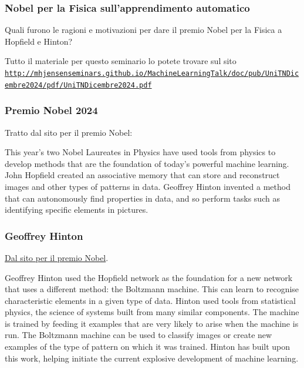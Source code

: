 \documentclass{beamer}
\begin{document}
\vspace{6mm}

\begin{frame}
\titlepage
\end{frame}

\begin{frame}
\frametitle{Nobel per la  Fisica  sull'apprendimento automatico}

\begin{block}{}
Quali furono le ragioni e motivazioni per dare  il premio Nobel per la Fisica a Hopfield e Hinton? 
\end{block}

\begin{block}{}
Tutto il materiale per questo seminario lo potete trovare sul sito  \href{{http://mhjensenseminars.github.io/MachineLearningTalk/doc/pub/UniTNDicembre2024/pdf/UniTNDicembre2024.pdf}}{\nolinkurl{http://mhjensenseminars.github.io/MachineLearningTalk/doc/pub/UniTNDicembre2024/pdf/UniTNDicembre2024.pdf}}
\end{block}
\end{frame}

\begin{frame}
\frametitle{Premio Nobel 2024}

Tratto dal sito per il premio Nobel:
\begin{block}{}
This year’s two Nobel Laureates in Physics have used tools from
physics to develop methods that are the foundation of today’s powerful
machine learning. John Hopfield created an associative memory that can
store and reconstruct images and other types of patterns in
data. Geoffrey Hinton invented a method that can autonomously find
properties in data, and so perform tasks such as identifying specific
elements in pictures.
\end{block}
\end{frame}

\begin{frame}
\frametitle{Geoffrey Hinton}

\href{{https://www.nobelprize.org/prizes/physics/2024/press-release/#:~:text=Geoffrey%20Hinton%20invented%20a%20method,learning%20using%20artificial%20neural%20networks}}{Dal sito per il premio Nobel}.
\begin{block}{}
Geoffrey Hinton used the Hopfield network as the foundation for a new
network that uses a different method: the Boltzmann machine. This can
learn to recognise characteristic elements in a given type of
data. Hinton used tools from statistical physics, the science of
systems built from many similar components. The machine is trained by
feeding it examples that are very likely to arise when the machine is
run. The Boltzmann machine can be used to classify images or create
new examples of the type of pattern on which it was trained. Hinton
has built upon this work, helping initiate the current explosive
development of machine learning.
\end{block}
\end{frame}
\end{document}
